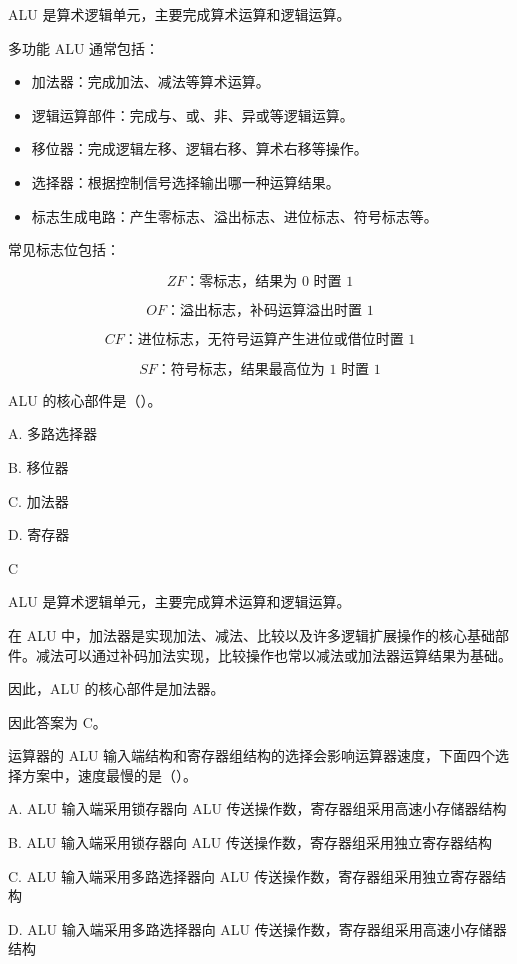 \begin{knowledge}
ALU 是算术逻辑单元，主要完成算术运算和逻辑运算。

多功能 ALU 通常包括：

\begin{itemize}
    \item 加法器：完成加法、减法等算术运算。
    \item 逻辑运算部件：完成与、或、非、异或等逻辑运算。
    \item 移位器：完成逻辑左移、逻辑右移、算术右移等操作。
    \item 选择器：根据控制信号选择输出哪一种运算结果。
    \item 标志生成电路：产生零标志、溢出标志、进位标志、符号标志等。
\end{itemize}

常见标志位包括：

\[
ZF：\text{零标志，结果为 }0\text{ 时置 }1
\]

\[
OF：\text{溢出标志，补码运算溢出时置 }1
\]

\[
CF：\text{进位标志，无符号运算产生进位或借位时置 }1
\]

\[
SF：\text{符号标志，结果最高位为 }1\text{ 时置 }1
\]
\end{knowledge}



\begin{question}
ALU 的核心部件是（）。

A. 多路选择器

B. 移位器

C. 加法器

D. 寄存器
\end{question}

\begin{answer}
C
\end{answer}

\begin{analysisenv}
ALU 是算术逻辑单元，主要完成算术运算和逻辑运算。

在 ALU 中，加法器是实现加法、减法、比较以及许多逻辑扩展操作的核心基础部件。减法可以通过补码加法实现，比较操作也常以减法或加法器运算结果为基础。

因此，ALU 的核心部件是加法器。

因此答案为 C。
\end{analysisenv}

\begin{question}
运算器的 ALU 输入端结构和寄存器组结构的选择会影响运算器速度，下面四个选择方案中，速度最慢的是（）。

A. ALU 输入端采用锁存器向 ALU 传送操作数，寄存器组采用高速小存储器结构

B. ALU 输入端采用锁存器向 ALU 传送操作数，寄存器组采用独立寄存器结构

C. ALU 输入端采用多路选择器向 ALU 传送操作数，寄存器组采用独立寄存器结构

D. ALU 输入端采用多路选择器向 ALU 传送操作数，寄存器组采用高速小存储器结构
\end{question}

